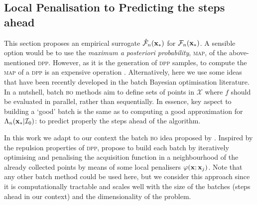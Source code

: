 \documentclass[twoside]{article}
\newcommand{\I}{\mathcal{I}}
\newcommand{\future}{\mathcal{F}}
\newcommand{\acr}[1]{\textsc{#1}\xspace}
\newcommand{\dpp}{\acr{dpp}}
\newcommand{\map}{\acr{map}}
\newcommand{\bo}{\acr{bo}}
\begin{document}

\subsection{Local Penalisation to Predicting the steps ahead}




This section proposes an empirical surrogate $\hat{\future}_n(\latentVector_*)$ for $\future_n(\latentVector_*)$. A sensible option would be to use the \emph{maximum a posteriori probability}, \map, of the above-mentioned \dpp. However, as it is the generation of \dpp samples, to compute the \map of a \dpp is an expensive operation \citep{NIPS2012_4577}. Alternatively, here we use some ideas that have been recently developed in the batch Bayesian optimisation literature. In a nutshell, batch \bo methods aim to define sets of points in $\mathcal{X}$ where $f$ should be evaluated in parallel, rather than sequentially. In essence, key aspect to building a `good' batch is the same as to computing a good approximation for $\Lambda_n(\latentVector_*|\I_0)$: to predict properly the steps ahead of the algorithm. 

In this work we adapt to our context the batch \bo idea proposed by \cite{gonzalez2015batch}. Inspired by the repulsion properties of \dpp , \cite{gonzalez2015batch} propose to build each batch by iteratively optimising and penalising the acquisition function in a neighbourhood of the   already collected points by means of some local penalisers $\varphi(\mathbf{x};\mathbf{x}_j)$. Note that any other batch method could be used here, but we consider this approach since it is computationally tractable and scales well with the size of the batches (steps ahead in our context) and the dimensionality of the problem.
\end{document}
